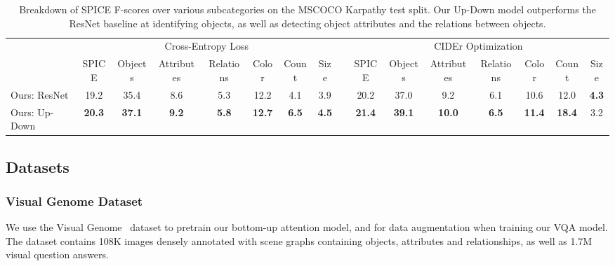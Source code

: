 \documentclass[10pt,twocolumn,letterpaper]{article}
\begin{document}
\begin{table*}
	\begin{center}\small
		\setlength{\tabcolsep}{.25em}
		\begin{tabular}{lccccccccccccccc}
			\midrule
			& \multicolumn{7}{c}{Cross-Entropy Loss}     &                                                    & \multicolumn{7}{c}{CIDEr Optimization}                                                       \\
			\cmidrule{2-8}
			\cmidrule{10-16}
			& SPICE  & Objects        & Attributes        & Relations       & Color       & Count          & Size   &  \:\:    & SPICE & Objects        & Attributes        & Relations        & Color       & Count          & Size         \\
			\midrule
			Ours: ResNet        & 19.2       & 35.4          & 8.6          & 5.3          & 12.2          & 4.1       & 3.9  & & 20.2          & 37.0          & 9.2          & 6.1          & 10.6          & 12.0   &   \textbf{4.3}    \\
			Ours: Up-Down    &   \textbf{20.3}    & \textbf{37.1} & \textbf{9.2} & \textbf{5.8} & \textbf{12.7} & \textbf{6.5} & \textbf{4.5} && \textbf{21.4} & \textbf{39.1} & \textbf{10.0} & \textbf{6.5} & \textbf{11.4} & \textbf{18.4}  & 3.2 \\
			\midrule
		\end{tabular}
	\end{center}
	\caption{Breakdown of SPICE F-scores over various subcategories on the MSCOCO Karpathy test split. Our Up-Down model outperforms the ResNet baseline at identifying objects, as well as detecting object attributes and the relations between objects. }
	\label{tab:spice}
\end{table*}

\subsection{Datasets}

\subsubsection{Visual Genome Dataset}

We use the Visual Genome~\cite{krishnavisualgenome} dataset to pretrain our bottom-up attention model, and for data augmentation when training our VQA model. The dataset contains 108K images densely annotated with scene graphs containing objects, attributes and relationships, as well as 1.7M visual question answers.
\end{document}
